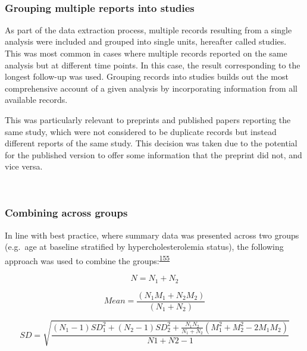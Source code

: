 \documentclass[a4paper, twoside]{templates/ociamthesis}
\begin{document}
~

\hypertarget{grouping-multiple-reports-into-studies}{%
\subsubsection{Grouping multiple reports into studies}\label{grouping-multiple-reports-into-studies}}

As part of the data extraction process, multiple records resulting from a single analysis were included and grouped into single units, hereafter called studies. This was most common in cases where multiple records reported on the same analysis but at different time points. In this case, the result corresponding to the longest follow-up was used. Grouping records into studies builds out the most comprehensive account of a given analysis by incorporating information from all available records.

This was particularly relevant to preprints and published papers reporting the same study, which were not considered to be duplicate records but instead different reports of the same study. This decision was taken due to the potential for the published version to offer some information that the preprint did not, and vice versa.

~

\hypertarget{combining-across-groups}{%
\subsubsection{Combining across groups}\label{combining-across-groups}}

In line with best practice, where summary data was presented across two groups (e.g.~age at baseline stratified by hypercholesterolemia status), the following approach was used to combine the groups:\textsuperscript{\protect\hyperlink{ref-higgins2019}{155}}

\begin{equation}
N = N_1 + N_2
  \label{eq:combiningGroups1}
\end{equation}

\begin{equation}
Mean = \frac{(N_1M_1 + N_2M_2)}{(N_1 + N_2)}
  \label{eq:combiningGroups2}
\end{equation}

\begin{equation}
SD = \sqrt{\frac{(N_1-1)SD_1^2 + (N_2-1)SD_2^2 + \frac{N_1N_2}{N_1 + N_2}(M_1^2 + M_2^2 - 2M_1M_2)}{N1 + N2 -1}}
  \label{eq:combiningGroups3}
\end{equation}
~
\end{document}
